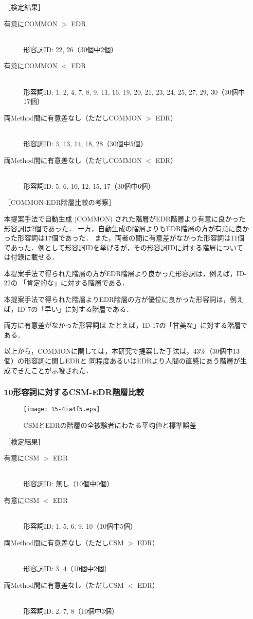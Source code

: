 \documentclass[japanese]{jnlp_1.4}
\begin{document}
\noindent
［検定結果］
\begin{description}
\item[有意にCOMMON $>$ EDR] \mbox{} \\
 形容詞ID: 22, 26（30個中2個）
\item[有意にCOMMON $<$ EDR] \mbox{} \\
形容詞ID: 1, 2, 4, 7, 8, 9, 11, 16, 19, 20, 21, 23, 24, 25, 27, 29, 30（30個中17個）
\item[両Method間に有意差なし（ただしCOMMON $>$ EDR）] \mbox{} \\
形容詞ID: 3, 13, 14, 18, 28（30個中5個）
\item[両Method間に有意差なし（ただしCOMMON $<$ EDR）] \mbox{} \\
形容詞ID: 5, 6, 10, 12, 15, 17（30個中6個）
\end{description}

\noindent
［COMMON-EDR階層比較の考察］

本提案手法で自動生成 (COMMON) された階層がEDR階層より有意に良かった形容詞は2個であった．
一方，自動生成の階層よりもEDR階層の方が有意に良かった形容詞は17個であった．
また，両者の間に有意差がなかった形容詞は11個であった．例として形容詞IDを挙げるが，その形容詞IDに対する階層については付録に載せる．

本提案手法で得られた階層の方がEDR階層より良かった形容詞は，例えば，ID-22の 「肯定的な」に対する階層である．

本提案手法で得られた階層よりEDR階層の方が優位に良かった形容詞は，例えば，ID-7の「早い」に対する階層である．

両方に有意差がなかった形容詞は たとえば，ID-17の「甘美な」に対する階層である．

以上から，COMMONに関しては，本研究で提案した手法は，43\%（30個中13個）の形容詞に関しEDRと
同程度あるいはEDRより人間の直感にあう階層が生成できたことが示唆された．


\subsubsection{10形容詞に対するCSM-EDR階層比較}

\begin{figure}[b]
\begin{center}
\texttt{[image: 15-4ia4f5.eps]}
\end{center}
\caption{CSMとEDRの階層の全被験者にわたる平均値と標準誤差}
\end{figure}


\noindent
［検定結果］
\begin{description}
\item[有意にCSM $>$ EDR] \mbox{} \\
形容詞ID: 無し（10個中0個）
\item[有意にCSM $<$ EDR] \mbox{} \\
形容詞ID: 1, 5, 6, 9, 10（10個中5個）
\item[両Method間に有意差なし（ただしCSM $>$ EDR）] \mbox{} \\
形容詞ID: 3, 4（10個中2個）
\item[両Method間に有意差なし（ただしCSM $<$ EDR）] \mbox{} \\
形容詞ID: 2, 7, 8（10個中3個）
\end{description}
\end{document}
